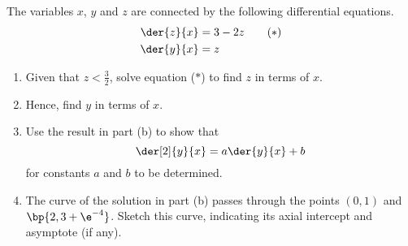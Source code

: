 \begin{problem}
    The variables $x$, $y$ and $z$ are connected by the following differential equations.
    \begin{align*}
        \der{z}{x} &= 3-2z \tag{$\ast$}\\
        \der{y}{x} &= z
    \end{align*}
    \begin{enumerate}
        \item Given that $z < \frac32$, solve equation ($\ast$) to find $z$ in terms of $x$.
        \item Hence, find $y$ in terms of $x$.
        \item Use the result in part (b) to show that \[\der[2]{y}{x} = a\der{y}{x} + b\] for constants $a$ and $b$ to be determined.
        \item The curve of the solution in part (b) passes through the points $(0, 1)$ and $\bp{2, 3+\e^{-4}}$. Sketch this curve, indicating its axial intercept and asymptote (if any).
    \end{enumerate}
\end{problem}
